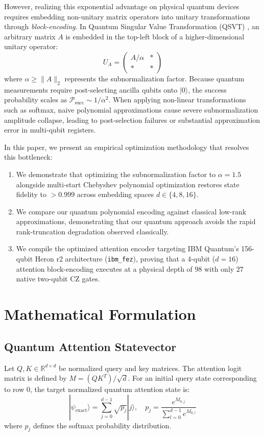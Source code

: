 \documentclass[conference]{IEEEtran}
\begin{document}
However, realizing this exponential advantage on physical quantum devices requires embedding non-unitary matrix operators into unitary transformations through \textit{block-encoding}. In Quantum Singular Value Transformation (QSVT) \cite{gilyen2019, martyn2021}, an arbitrary matrix $A$ is embedded in the top-left block of a higher-dimensional unitary operator:
\begin{equation}
U_A = \begin{pmatrix} A/\alpha & * \\ * & * \end{pmatrix}
\end{equation}
where $\alpha \ge \|A\|_2$ represents the subnormalization factor. Because quantum measurements require post-selecting ancilla qubits onto $|0\rangle$, the success probability scales as $\mathcal{P}_{\text{succ}} \sim 1/\alpha^2$. When applying non-linear transformations such as softmax, naive polynomial approximations cause severe subnormalization amplitude collapse, leading to post-selection failures or substantial approximation error in multi-qubit registers.

In this paper, we present an empirical optimization methodology that resolves this bottleneck:
\begin{enumerate}
    \item We demonstrate that optimizing the subnormalization factor to $\alpha = 1.5$ alongside multi-start Chebyshev polynomial optimization restores state fidelity to $>0.999$ across embedding spaces $d \in \{4, 8, 16\}$.
    \item We compare our quantum polynomial encoding against classical low-rank approximations, demonstrating that our quantum approach avoids the rapid rank-truncation degradation observed classically.
    \item We compile the optimized attention encoder targeting IBM Quantum's 156-qubit Heron r2 architecture (\texttt{ibm\_fez}), proving that a 4-qubit ($d=16$) attention block-encoding executes at a physical depth of $98$ with only $27$ native two-qubit CZ gates.
\end{enumerate}

\section{Mathematical Formulation}

\subsection{Quantum Attention Statevector}
Let $Q, K \in \mathbb{R}^{d \times d}$ be normalized query and key matrices. The attention logit matrix is defined by $M = (QK^T)/\sqrt{d}$. For an initial query state corresponding to row $0$, the target normalized quantum attention state is:
\begin{equation}
|\psi_{\text{exact}}\rangle = \sum_{j=0}^{d-1} \sqrt{p_j} |j\rangle, \quad p_j = \frac{e^{M_{0, j}}}{\sum_{l=0}^{d-1} e^{M_{0, l}}}
\end{equation}
where $p_j$ defines the softmax probability distribution.
\end{document}
